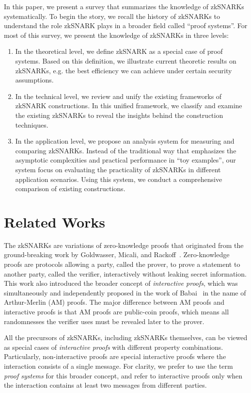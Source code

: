 \documentclass[acmtog]{acmart}
\begin{document}
In this paper, we present a survey that summarizes the knowledge of zkSNARKs systematically.
To begin the story, we recall the history of zkSNARKs to understand the role zkSNARK plays in a broader field called ``proof systems''.
For most of this survey, we present the knowledge of zkSNARKs in three levels:
\begin{enumerate}
	\item In the theoretical level, we define zkSNARK as a special case of proof systems.
	Based on this definition, we illustrate current theoretic results on zkSNARKs, e.g. the best efficiency we can achieve under certain security assumptions.
	\item In the technical level, we review and unify the existing frameworks of zkSNARK constructions.
	In this unified framework, we classify and examine the existing zkSNARKs to reveal the insights behind the construction techniques.
	\item In the application level, we propose an analysis system for measuring and comparing zkSNARKs.
	Instead of the traditional way that emphasizes the asymptotic complexities and practical performance in ``toy examples'', our system focus on evaluating the practicality of zkSNARKs in different application scenarios.
	Using this system, we conduct a comprehensive comparison of existing constructions.
\end{enumerate}

\section{Related Works}

The zkSNARKs are variations of zero-knowledge proofs that originated from the ground-breaking work by Goldwasser, Micali, and Rackoff~\cite{GoldwasserMR85}.
Zero-knowledge proofs are protocols allowing a party, called the prover, to prove a statement to another party, called the verifier, interactively without leaking secret information.
This work also introduced the broader concept of \emph{interactive proofs}, which was simultaneously and independently proposed in the work of Babai~\cite{Babai85} in the name of Arthur-Merlin (AM) proofs.
The major difference between AM proofs and interactive proofs is that AM proofs are public-coin proofs, which means all randomnesses the verifier uses must be revealed later to the prover.

All the precursors of zkSNARKs, including zkSNARKs themselves, can be viewed as special cases of \emph{interactive proofs} with different property combinations.
Particularly, non-interactive proofs are special interactive proofs where the interaction consists of a single message.
For clarity, we prefer to use the term \emph{proof systems} for this broader concept, and refer to interactive proofs only when the interaction contains at least two messages from different parties.
\end{document}

